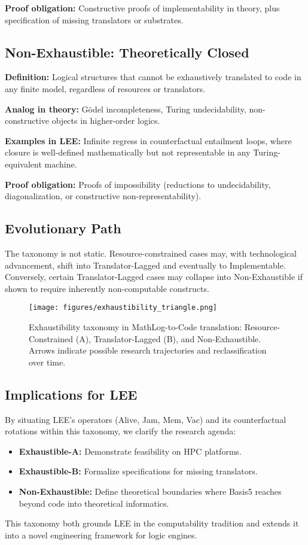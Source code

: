 \textbf{Proof obligation:} Constructive proofs of implementability in theory, 
plus specification of missing translators or substrates.  

\subsection{Non-Exhaustible: Theoretically Closed}
\textbf{Definition:} Logical structures that cannot be exhaustively translated 
to code in any finite model, regardless of resources or translators.  

\textbf{Analog in theory:} Gödel incompleteness, Turing undecidability, 
non-constructive objects in higher-order logics.  

\textbf{Examples in LEE:} Infinite regress in counterfactual entailment loops, 
where closure is well-defined mathematically but not representable 
in any Turing-equivalent machine.  

\textbf{Proof obligation:} Proofs of impossibility (reductions to undecidability, 
diagonalization, or constructive non-representability).  

\subsection{Evolutionary Path}
The taxonomy is not static. Resource-constrained cases may, with technological 
advancement, shift into Translator-Lagged and eventually to Implementable. 
Conversely, certain Translator-Lagged cases may collapse into Non-Exhaustible 
if shown to require inherently non-computable constructs.

\begin{figure}[h]
	\centering
	\texttt{[image: figures/exhaustibility\_triangle.png]}
	\caption{Exhaustibility taxonomy in MathLog-to-Code translation: 
		Resource-Constrained (A), Translator-Lagged (B), and Non-Exhaustible. 
		Arrows indicate possible research trajectories and reclassification 
		over time.}
\end{figure}

\subsection{Implications for LEE}
By situating LEE’s operators (Alive, Jam, Mem, Vac) and its counterfactual 
rotations within this taxonomy, we clarify the research agenda:  
\begin{itemize}
	\item \textbf{Exhaustible-A:} Demonstrate feasibility on HPC platforms.  
	\item \textbf{Exhaustible-B:} Formalize specifications for missing translators.  
	\item \textbf{Non-Exhaustible:} Define theoretical boundaries where 
	Basis5 reaches beyond code into theoretical informatics.  
\end{itemize}

This taxonomy both grounds LEE in the computability tradition and 
extends it into a novel engineering framework for logic engines.
